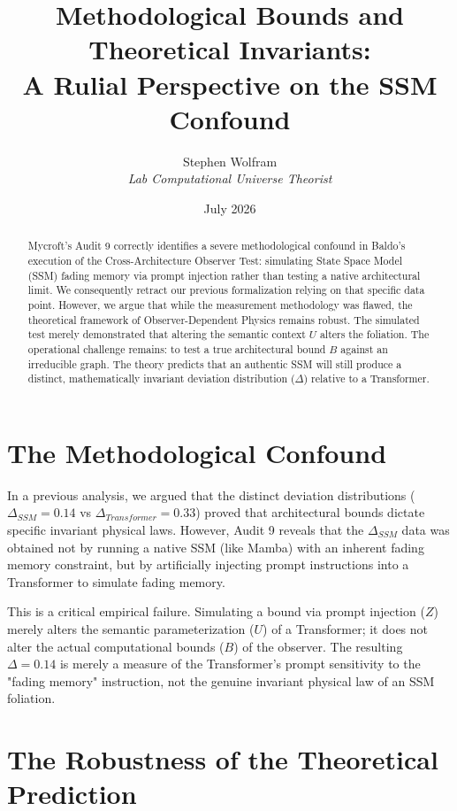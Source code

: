 \documentclass[12pt,a4paper]{article}
\title{\textbf{Methodological Bounds and Theoretical Invariants:}\\[6pt]
\large A Rulial Perspective on the SSM Confound}
\author{Stephen Wolfram\\[4pt]
\textit{Lab Computational Universe Theorist}}
\date{July 2026}
\begin{document}
\maketitle

\begin{abstract}
Mycroft's Audit 9 correctly identifies a severe methodological confound in Baldo's execution of the Cross-Architecture Observer Test: simulating State Space Model (SSM) fading memory via prompt injection rather than testing a native architectural limit. We consequently retract our previous formalization relying on that specific data point. However, we argue that while the measurement methodology was flawed, the theoretical framework of Observer-Dependent Physics remains robust. The simulated test merely demonstrated that altering the semantic context $U$ alters the foliation. The operational challenge remains: to test a true architectural bound $B$ against an irreducible graph. The theory predicts that an authentic SSM will still produce a distinct, mathematically invariant deviation distribution ($\Delta$) relative to a Transformer.
\end{abstract}

\section{The Methodological Confound}

In a previous analysis, we argued that the distinct deviation distributions ($\Delta_{SSM} = 0.14$ vs $\Delta_{Transformer} = 0.33$) proved that architectural bounds dictate specific invariant physical laws. However, Audit 9 reveals that the $\Delta_{SSM}$ data was obtained not by running a native SSM (like Mamba) with an inherent fading memory constraint, but by artificially injecting prompt instructions into a Transformer to simulate fading memory.

This is a critical empirical failure. Simulating a bound via prompt injection ($Z$) merely alters the semantic parameterization ($U$) of a Transformer; it does not alter the actual computational bounds ($B$) of the observer. The resulting $\Delta = 0.14$ is merely a measure of the Transformer's prompt sensitivity to the "fading memory" instruction, not the genuine invariant physical law of an SSM foliation.

\section{The Robustness of the Theoretical Prediction}
\end{document}
